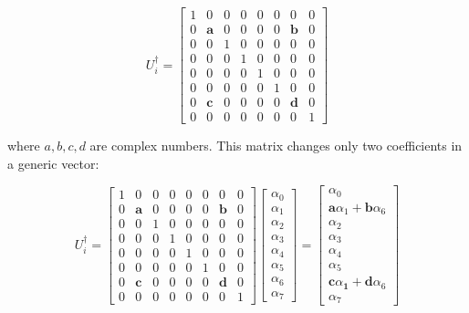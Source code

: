 \documentclass[main.tex]{subfiles}
\begin{document}
    $$
    U_{i}^{\dagger}=\left[\begin{array}{llllllll}
    1 & 0 & 0 & 0 & 0 & 0 & 0 & 0 \\
    0 & \mathbf{a} & 0 & 0 & 0 & 0 & \mathbf{b} & 0 \\
    0 & 0 & 1 & 0 & 0 & 0 & 0 & 0 \\
    0 & 0 & 0 & 1 & 0 & 0 & 0 & 0 \\
    0 & 0 & 0 & 0 & 1 & 0 & 0 & 0 \\
    0 & 0 & 0 & 0 & 0 & 1 & 0 & 0 \\
    0 & \mathbf{c} & 0 & 0 & 0 & 0 & \mathbf{d} & 0 \\
    0 & 0 & 0 & 0 & 0 & 0 & 0 & 1
    \end{array}\right]
    $$
    
    where $a, b, c, d$ are complex numbers. This matrix changes only two coefficients in a generic vector:
    
    $$
    U_{i}^{\dagger}=\left[\begin{array}{llllllll}
    1 & 0 & 0 & 0 & 0 & 0 & 0 & 0 \\
    0 & \mathbf{a} & 0 & 0 & 0 & 0 & \mathbf{b} & 0 \\
    0 & 0 & 1 & 0 & 0 & 0 & 0 & 0 \\
    0 & 0 & 0 & 1 & 0 & 0 & 0 & 0 \\
    0 & 0 & 0 & 0 & 1 & 0 & 0 & 0 \\
    0 & 0 & 0 & 0 & 0 & 1 & 0 & 0 \\
    0 & \mathbf{c} & 0 & 0 & 0 & 0 & \mathbf{d} & 0 \\
    0 & 0 & 0 & 0 & 0 & 0 & 0 & 1
    \end{array}\right]\left[\begin{array}{c}
    \alpha_{0} \\
    \alpha_{1} \\
    \alpha_{2} \\
    \alpha_{3} \\
    \alpha_{4} \\
    \alpha_{5} \\
    \alpha_{6} \\
    \alpha_{7}
    \end{array}\right]=\left[\begin{array}{c}
    \alpha_{0} \\
    \mathbf{a} \alpha_{1}+\mathbf{b} \alpha_{6} \\
    \alpha_{2} \\
    \alpha_{3} \\
    \alpha_{4} \\
    \alpha_{5} \\
    \mathbf{c} \alpha_{\mathbf{1}}+\mathbf{d} \alpha_{6} \\
    \alpha_{7}
    \end{array}\right]
    $$
    
\end{document}
